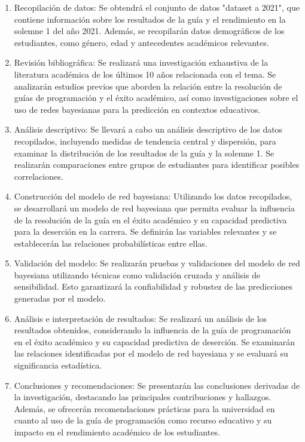 \begin{enumerate}
    \item Recopilación de datos: Se obtendrá el conjunto de datos "dataset a 2021", que contiene información sobre los resultados de la guía y el rendimiento en la solemne 1 del año 2021. Además, se recopilarán datos demográficos de los estudiantes, como género, edad y antecedentes académicos relevantes.

    \item Revisión bibliográfica: Se realizará una investigación exhaustiva de la literatura académica de los últimos 10 años relacionada con el tema. Se analizarán estudios previos que aborden la relación entre la resolución de guías de programación y el éxito académico, así como investigaciones sobre el uso de redes bayesianas para la predicción en contextos educativos.

    \item Análisis descriptivo: Se llevará a cabo un análisis descriptivo de los datos recopilados, incluyendo medidas de tendencia central y dispersión, para examinar la distribución de los resultados de la guía y la solemne 1. Se realizarán comparaciones entre grupos de estudiantes para identificar posibles correlaciones.

    \item Construcción del modelo de red bayesiana: Utilizando los datos recopilados, se desarrollará un modelo de red bayesiana que permita evaluar la influencia de la resolución de la guía en el éxito académico y su capacidad predictiva para la deserción en la carrera. Se definirán las variables relevantes y se establecerán las relaciones probabilísticas entre ellas.

    \item Validación del modelo: Se realizarán pruebas y validaciones del modelo de red bayesiana utilizando técnicas como validación cruzada y análisis de sensibilidad. Esto garantizará la confiabilidad y robustez de las predicciones generadas por el modelo.

    \item Análisis e interpretación de resultados: Se realizará un análisis de los resultados obtenidos, considerando la influencia de la guía de programación en el éxito académico y su capacidad predictiva de deserción. Se examinarán las relaciones identificadas por el modelo de red bayesiana y se evaluará su significancia estadística.

    \item Conclusiones y recomendaciones: Se presentarán las conclusiones derivadas de la investigación, destacando las principales contribuciones y hallazgos. Además, se ofrecerán recomendaciones prácticas para la universidad en cuanto al uso de la guía de programación como recurso educativo y su impacto en el rendimiento académico de los estudiantes.
\end{enumerate}

